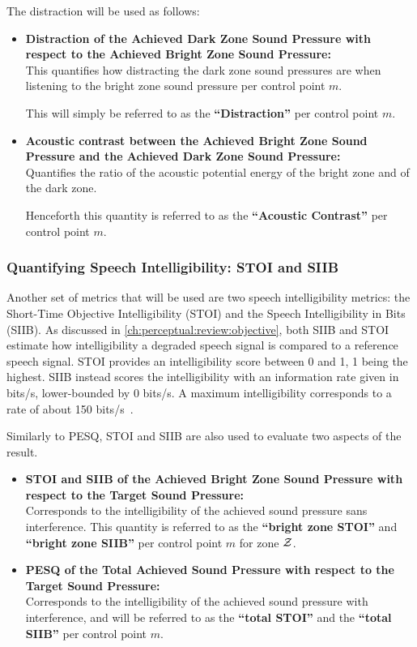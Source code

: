 The distraction will be used as follows:
\begin{itemize}
    \item \textbf{Distraction of the Achieved Dark Zone Sound Pressure with respect to the Achieved Bright Zone Sound Pressure:}\\
        This quantifies how distracting the dark zone sound pressures are when listening to the bright zone sound pressure per control point $m$. 

        This will simply be referred to as the \textbf{``Distraction''} per control point $m$.
    \item \textbf{Acoustic contrast between the Achieved Bright Zone Sound Pressure and the Achieved Dark Zone Sound Pressure:}\\
        Quantifies the ratio of the acoustic potential energy of the bright zone and of the dark zone.

        Henceforth this quantity is referred to as the \textbf{``Acoustic Contrast''} per control point $m$.
\end{itemize}

\subsubsection*{Quantifying Speech Intelligibility: STOI and SIIB}
Another set of metrics that will be used are two speech intelligibility metrics: the Short-Time Objective Intelligibility (STOI) and 
the Speech Intelligibility in Bits (SIIB).
As discussed in \autoref{ch:perceptual:review:objective}, both SIIB and STOI estimate how intelligibility a degraded speech signal is 
compared to a reference speech signal.
STOI provides an intelligibility score between 0 and 1, 1 being the highest.
SIIB instead scores the intelligibility with an information rate given in bits/s, lower-bounded by 0 bits/s.
A maximum intelligibility corresponds to a rate of about 150 bits/s~\cite{van2017instrumental}.

Similarly to PESQ, STOI and SIIB are also used to evaluate two aspects of the result.
\begin{itemize}
    \item \textbf{STOI and SIIB of the Achieved Bright Zone Sound Pressure with respect to the Target Sound Pressure:}\\
        Corresponds to the intelligibility of the achieved sound pressure sans interference.
        This quantity is referred to as the \textbf{``bright zone STOI''} and \textbf{``bright zone SIIB''} per control point $m$ for zone $\mathcal{Z}$.
    \item \textbf{PESQ of the Total Achieved Sound Pressure with respect to the Target Sound Pressure:}\\
        Corresponds to the intelligibility of the achieved sound pressure with interference, and will be referred 
        to as the \textbf{``total STOI''} and the \textbf{``total SIIB''} per control point $m$. 
\end{itemize}
